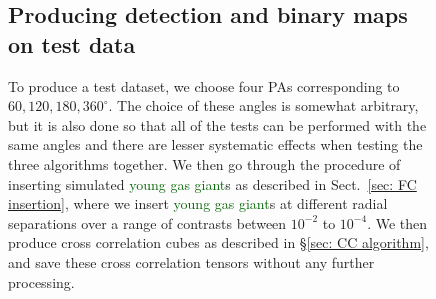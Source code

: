 \documentclass{aa}
\newcommand{\newchange}[1]{\textcolor{darkgreen}{#1}}
\begin{document}
{{{\begin{figure}[t]
\subsection{Producing detection and binary maps on test data}\label{sec:testdata}

To produce a test dataset, we choose four PAs corresponding to $60,120,180,360^{\circ}$.
The choice of these angles is somewhat arbitrary, but it is also done so that all of the tests can be performed with the same angles and there are lesser systematic effects when testing the three algorithms together.
We then go through the procedure of inserting simulated \newchange{young gas giant}s as described in Sect.~\ref{sec: FC insertion}, where we insert \newchange{young gas giant}s at different radial separations over a range of contrasts between $10^{-2}$ to $10^{-4}$. We then produce cross correlation cubes as described in \S\ref{sec: CC algorithm}, and save these cross correlation tensors without any further processing.


\end{figure}}}}
\end{document}

